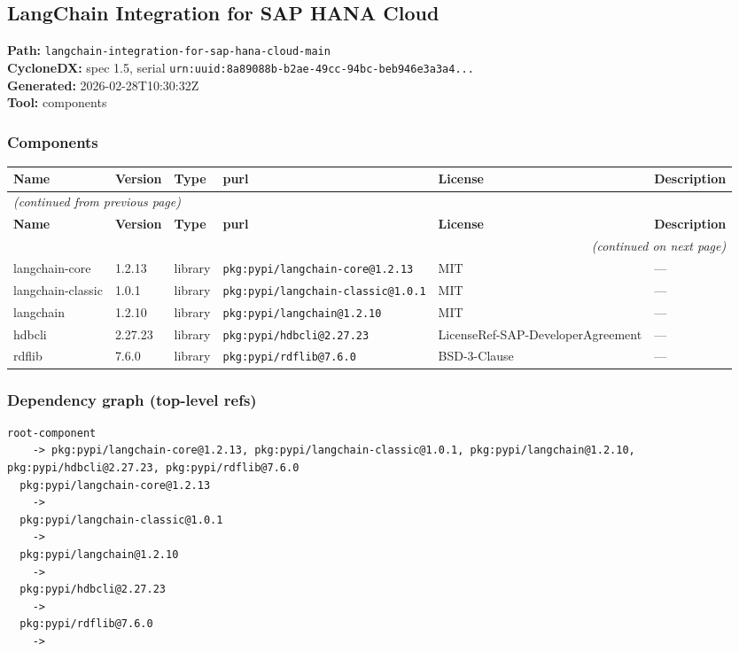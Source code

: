 \documentclass[11pt,a4paper]{article}
\begin{document}
\subsection{LangChain Integration for SAP HANA Cloud}
\textbf{Path:} \texttt{langchain-integration-for-sap-hana-cloud-main}
\\ \textbf{CycloneDX:} spec 1.5, serial \texttt{urn:uuid:8a89088b-b2ae-49cc-94bc-beb946e3a3a4...}
\\ \textbf{Generated:} 2026-02-28T10:30:32Z
\\ \textbf{Tool:} components

\subsubsection*{Components}
\begin{longtable}{|p{4cm}|p{2cm}|p{1.6cm}|p{5cm}|p{1.5cm}|p{3.5cm}|}
\toprule
\rowcolor{sbomhdr}\textbf{Name} & \textbf{Version} & \textbf{Type} & \textbf{purl} & \textbf{License} & \textbf{Description} \\
\midrule
\endfirsthead
\multicolumn{6}{l}{\small\itshape (continued from previous page)} \\
\toprule
\rowcolor{sbomhdr}\textbf{Name} & \textbf{Version} & \textbf{Type} & \textbf{purl} & \textbf{License} & \textbf{Description} \\
\midrule
\endhead
\midrule
\multicolumn{6}{r}{\small\itshape (continued on next page)} \\
\endfoot
\bottomrule
\endlastfoot
\raggedright langchain-core & 1.2.13 & library & \small\texttt{pkg:pypi/langchain-core@1.2.13} & MIT & \small — \\
\raggedright langchain-classic & 1.0.1 & library & \small\texttt{pkg:pypi/langchain-classic@1.0.1} & MIT & \small — \\
\raggedright langchain & 1.2.10 & library & \small\texttt{pkg:pypi/langchain@1.2.10} & MIT & \small — \\
\raggedright hdbcli & 2.27.23 & library & \small\texttt{pkg:pypi/hdbcli@2.27.23} & LicenseRef-SAP-DeveloperAgreement & \small — \\
\raggedright rdflib & 7.6.0 & library & \small\texttt{pkg:pypi/rdflib@7.6.0} & BSD-3-Clause & \small — \\
\end{longtable}

\subsubsection*{Dependency graph (top-level refs)}
\begin{lstlisting}[style=depgraph]
  root-component
    -> pkg:pypi/langchain-core@1.2.13, pkg:pypi/langchain-classic@1.0.1, pkg:pypi/langchain@1.2.10, pkg:pypi/hdbcli@2.27.23, pkg:pypi/rdflib@7.6.0
  pkg:pypi/langchain-core@1.2.13
    -> 
  pkg:pypi/langchain-classic@1.0.1
    -> 
  pkg:pypi/langchain@1.2.10
    -> 
  pkg:pypi/hdbcli@2.27.23
    -> 
  pkg:pypi/rdflib@7.6.0
    -> 
\end{lstlisting}
\end{document}
